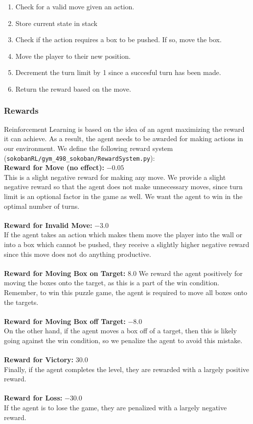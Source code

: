 \documentclass[twoside,11pt]{article}
\begin{document}
\begin{enumerate}
       \item Check for a valid move given an action.
       \item Store current state in stack
       \item Check if the action requires a box to be pushed. If so, move the box.
       \item Move the player to their new position.
       \item Decrement the turn limit by 1 since a succesful turn has been made.
       \item Return the reward based on the move.
\end{enumerate}

\subsubsection{Rewards}
Reinforcement Learning is based on the idea of an agent maximizing the reward it can achieve. As a result, the agent needs to be awarded for making actions in our environment. We define the following reward system (\verb|sokobanRL/gym_498_sokoban/RewardSystem.py|):\\

\noindent\textbf{Reward for Move (no effect):} $-0.05$\\
This is a slight negative reward for making any move. We provide a slight negative reward so that the agent does not make unnecessary moves, since turn limit is an optional factor in the game as well. We want the agent to win in the optimal number of turns.\\\\
\textbf{Reward for Invalid Move:} $-3.0$\\
If the agent takes an action which makes them move the player into the wall or into a box which cannot be pushed, they receive a slightly higher negative reward since this move does not do anything productive.\\\\
\textbf{Reward for Moving Box on Target:} $8.0$
We reward the agent positively for moving the boxes onto the target, as this is a part of the win condition. Remember, to win this puzzle game, the agent is required to move all boxes onto the targets.\\\\
\textbf{Reward for Moving Box off Target:} $-8.0$\\
On the other hand, if the agent moves a box off of a target, then this is likely going against the win condition, so we penalize the agent to avoid this mistake.\\\\
\textbf{Reward for Victory:} $30.0$\\
Finally, if the agent completes the level, they are rewarded with a largely positive reward.\\\\
\textbf{Reward for Loss:} $-30.0$\\
If the agent is to lose the game, they are penalized with a largely negative reward.
\end{document}
